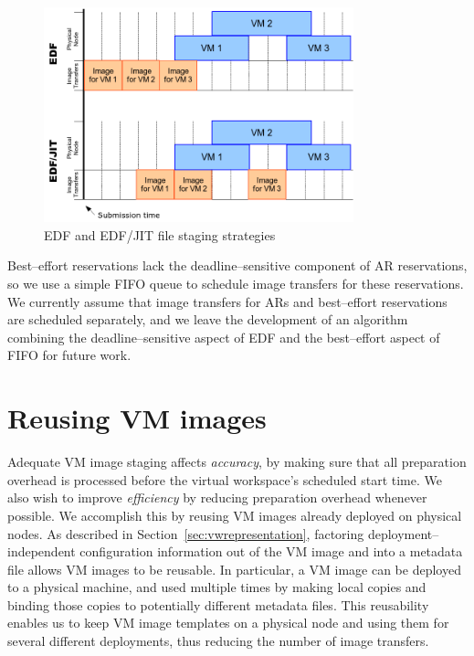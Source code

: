 \begin{figure}
  \begin{center}
    \includegraphics[width=0.8\textwidth]{figures/edf.png}
    \caption{EDF and EDF/JIT file staging strategies}
	\label{fig:edf}
  \end{center}
\end{figure}

Best--effort reservations lack the deadline--sensitive component of AR reservations, so we use a simple FIFO queue to schedule image transfers for these reservations. We currently assume that image transfers for ARs and best--effort reservations are scheduled separately, and we leave the development of an algorithm combining the deadline--sensitive aspect of EDF and the best--effort aspect of FIFO for future work.


\section{Reusing VM images}
\label{sec:reuse}

Adequate VM image staging affects \emph{accuracy}, by making sure that all preparation overhead is processed before the virtual workspace's scheduled start time. We also wish to improve \emph{efficiency} by reducing preparation overhead whenever possible. We accomplish this by reusing VM images already deployed on physical nodes. As described in Section~\ref{sec:vwrepresentation}, factoring deployment--independent configuration information out of the VM image and into a metadata file allows VM images to be reusable. In particular, a VM image can be deployed to a physical machine, and used multiple times by making local copies and binding those copies to potentially different metadata files. This reusability enables us to keep VM image templates on a physical node and using them for several different deployments, thus reducing the number of image transfers.


